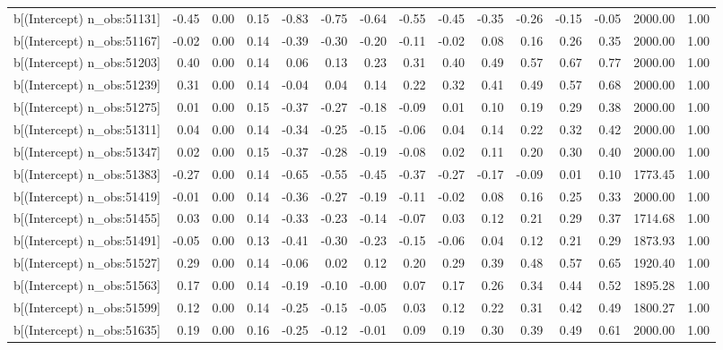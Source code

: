 \begin{table}[ht]
\begin{tabular}{rrrrrrrrrrrrrrr}
  b[(Intercept) n\_obs:51131] & -0.45 & 0.00 & 0.15 & -0.83 & -0.75 & -0.64 & -0.55 & -0.45 & -0.35 & -0.26 & -0.15 & -0.05 & 2000.00 & 1.00 \\ 
  b[(Intercept) n\_obs:51167] & -0.02 & 0.00 & 0.14 & -0.39 & -0.30 & -0.20 & -0.11 & -0.02 & 0.08 & 0.16 & 0.26 & 0.35 & 2000.00 & 1.00 \\ 
  b[(Intercept) n\_obs:51203] & 0.40 & 0.00 & 0.14 & 0.06 & 0.13 & 0.23 & 0.31 & 0.40 & 0.49 & 0.57 & 0.67 & 0.77 & 2000.00 & 1.00 \\ 
  b[(Intercept) n\_obs:51239] & 0.31 & 0.00 & 0.14 & -0.04 & 0.04 & 0.14 & 0.22 & 0.32 & 0.41 & 0.49 & 0.57 & 0.68 & 2000.00 & 1.00 \\ 
  b[(Intercept) n\_obs:51275] & 0.01 & 0.00 & 0.15 & -0.37 & -0.27 & -0.18 & -0.09 & 0.01 & 0.10 & 0.19 & 0.29 & 0.38 & 2000.00 & 1.00 \\ 
  b[(Intercept) n\_obs:51311] & 0.04 & 0.00 & 0.14 & -0.34 & -0.25 & -0.15 & -0.06 & 0.04 & 0.14 & 0.22 & 0.32 & 0.42 & 2000.00 & 1.00 \\ 
  b[(Intercept) n\_obs:51347] & 0.02 & 0.00 & 0.15 & -0.37 & -0.28 & -0.19 & -0.08 & 0.02 & 0.11 & 0.20 & 0.30 & 0.40 & 2000.00 & 1.00 \\ 
  b[(Intercept) n\_obs:51383] & -0.27 & 0.00 & 0.14 & -0.65 & -0.55 & -0.45 & -0.37 & -0.27 & -0.17 & -0.09 & 0.01 & 0.10 & 1773.45 & 1.00 \\ 
  b[(Intercept) n\_obs:51419] & -0.01 & 0.00 & 0.14 & -0.36 & -0.27 & -0.19 & -0.11 & -0.02 & 0.08 & 0.16 & 0.25 & 0.33 & 2000.00 & 1.00 \\ 
  b[(Intercept) n\_obs:51455] & 0.03 & 0.00 & 0.14 & -0.33 & -0.23 & -0.14 & -0.07 & 0.03 & 0.12 & 0.21 & 0.29 & 0.37 & 1714.68 & 1.00 \\ 
  b[(Intercept) n\_obs:51491] & -0.05 & 0.00 & 0.13 & -0.41 & -0.30 & -0.23 & -0.15 & -0.06 & 0.04 & 0.12 & 0.21 & 0.29 & 1873.93 & 1.00 \\ 
  b[(Intercept) n\_obs:51527] & 0.29 & 0.00 & 0.14 & -0.06 & 0.02 & 0.12 & 0.20 & 0.29 & 0.39 & 0.48 & 0.57 & 0.65 & 1920.40 & 1.00 \\ 
  b[(Intercept) n\_obs:51563] & 0.17 & 0.00 & 0.14 & -0.19 & -0.10 & -0.00 & 0.07 & 0.17 & 0.26 & 0.34 & 0.44 & 0.52 & 1895.28 & 1.00 \\ 
  b[(Intercept) n\_obs:51599] & 0.12 & 0.00 & 0.14 & -0.25 & -0.15 & -0.05 & 0.03 & 0.12 & 0.22 & 0.31 & 0.42 & 0.49 & 1800.27 & 1.00 \\ 
  b[(Intercept) n\_obs:51635] & 0.19 & 0.00 & 0.16 & -0.25 & -0.12 & -0.01 & 0.09 & 0.19 & 0.30 & 0.39 & 0.49 & 0.61 & 2000.00 & 1.00 \\ 

\end{tabular}
\end{table}
